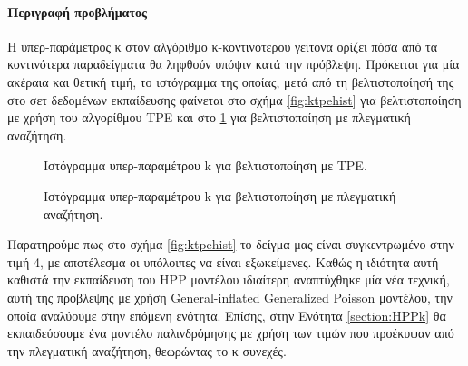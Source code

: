 \paragraph{Περιγραφή προβλήματος} Η υπερ-παράμετρος κ στον αλγόριθμο κ-κοντινότερου γείτονα ορίζει πόσα από τα κοντινότερα παραδείγματα θα ληφθούν υπόψιν κατά την πρόβλεψη. Πρόκειται για μία ακέραια και θετική τιμή, το ιστόγραμμα της οποίας, μετά από τη βελτιστοποίησή της στο σετ δεδομένων εκπαίδευσης φαίνεται στο σχήμα  \ref{fig:ktpehist} για βελτιστοποίηση με χρήση του αλγορίθμου \gls{TPE} και στο \ref{fig:kgridhist} για βελτιστοποίηση με πλεγματική αναζήτηση.

\begin{figure}[!htb]
	\begin{minipage}{0.48\textwidth}
						\scalebox{0.4}{
							}
							\captionsetup[subfigure]{width=0.8\textwidth}
							\caption{Ιστόγραμμα υπερ-παραμέτρου k για βελτιστοποίηση με \gls{TPE}.}
						\label{fig:ktpehist}
	\end{minipage}
	\begin{minipage}{0.48\textwidth}
						\scalebox{0.4}{
			}
			\captionsetup[subfigure]{width=0.8\textwidth}
				\caption{Ιστόγραμμα υπερ-παραμέτρου k για βελτιστοποίηση με πλεγματική αναζήτηση.}
		    \label{fig:kgridhist}
	\end{minipage}
\end{figure}

Παρατηρούμε πως στο σχήμα \ref{fig:ktpehist} το δείγμα μας είναι συγκεντρωμένο στην τιμή 4, με αποτέλεσμα οι υπόλοιπες να είναι εξωκείμενες. Καθώς η ιδιότητα αυτή καθιστά την εκπαίδευση του \gls{HPP} μοντέλου ιδιαίτερη αναπτύχθηκε μία νέα τεχνική, αυτή της πρόβλεψης με χρήση General-inflated Generalized Poisson μοντέλου, την οποία αναλύουμε στην επόμενη ενότητα. Επίσης, στην Ενότητα \ref{section:HPPk} θα εκπαιδεύσουμε ένα μοντέλο παλινδρόμησης με χρήση των τιμών που προέκυψαν από την πλεγματική αναζήτηση, θεωρώντας το κ συνεχές. 


